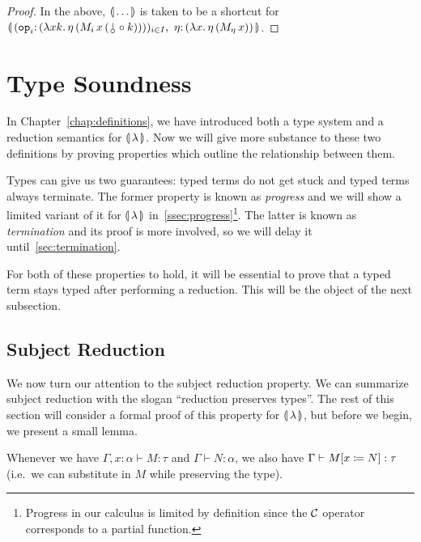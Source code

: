 \begin{proof}
  In the above, $\llparenthesis \, \ldots \, \rrparenthesis$ is taken to be a shortcut for
  $\banana{(\onto{\op{op}_i}{(\lam{x
        k}{\ap{\eta}{(\ap{\ap{M_i}{x}}{(\cherry \circ k)})}})})_{i \in I},\
    \onto{\eta}{(\lam{x}{\etaE{(\ap{M_\eta}{x})}})}}$.
\end{proof}


\section{Type Soundness}
\label{sec:type-soundness}

In Chapter~\ref{chap:definitions}, we have introduced both a type system
and a reduction semantics for $\llparenthesis \, \lambda \, \rrparenthesis$. Now we will give more
substance to these two definitions by proving properties which outline the
relationship between them.

Types can give us two guarantees: typed terms do not get stuck and typed
terms always terminate. The former property is known as \emph{progress} and
we will show a limited variant of it for $\llparenthesis \, \lambda \, \rrparenthesis$
in~\ref{ssec:progress}\footnote{Progress in our calculus is limited by
  definition since the $\mathcal{C}$ operator corresponds to a partial
  function.}. The latter is known as \emph{termination} and its proof is
more involved, so we will delay it until~\ref{sec:termination}.

For both of these properties to hold, it will be essential to prove that a
typed term stays typed after performing a reduction. This will be the
object of the next subsection.


\subsection{Subject Reduction}
\label{ssec:subject-reduction}

We now turn our attention to the subject reduction property. We can
summarize subject reduction with the slogan ``reduction preserves
types''. The rest of this section will consider a formal proof of this
property for $\llparenthesis \, \lambda \, \rrparenthesis$, but before we begin, we present a small
lemma.

\begin{lemma}\label{lem:substitution-types}
  
  Whenever we have $\Gamma, x : \alpha \vdash M : \tau$ and
  $\Gamma \vdash N : \alpha$, we also have
  $\Gamma \vdash M[x \coloneqq N] : \tau$ (i.e.\ we can substitute in $M$
  while preserving the type).
\end{lemma}


